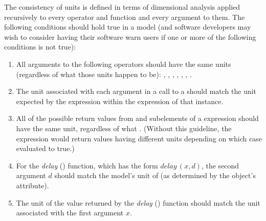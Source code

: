 The consistency of units is defined in terms of dimensional
analysis applied recursively to every operator and function and
every argument to them.  The following conditions should hold true
in a model (and software developers may wish to consider having
their software warn users if one or more of the following
conditions is not true):

\begin{enumerate}

\item All arguments to the following operators should have the same
  units (regardless of what those units happen to be):
  , , ,  ,
  , , .  

\item The unit associated with each argument in a call to a
  \FunctionDefinition should match the unit expected by the
   expression within the  expression of
  that \FunctionDefinition instance.


\item All of the possible return values from  and
   subelements of a  expression
  should have the same unit, regardless of what .
  (Without this guideline, the  expression would
  return values having different units depending on which case
  evaluated to true.)  

\item For the \emph{delay} 
  () function, which has the form
  $\textit{delay}\,(x, d)$, the second argument $d$ should match
  the model's unit of  (as determined by the \Model
  object's  attribute).

\item The unit of the value returned by the \emph{delay}
   () function
  should match the unit associated with the first argument $x$.



\end{enumerate}
